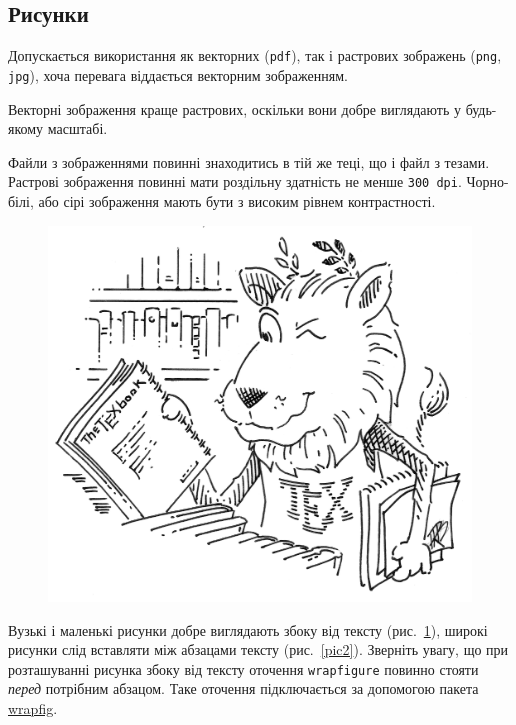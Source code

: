 \documentclass[]{iptconf}
\begin{document}





\subsection{Рисунки}





Допускається використання як векторних (\texttt{pdf}), так і растрових зображень (\texttt{png}, \texttt{jpg}), хоча перевага віддається векторним зображенням.

Векторні зображення краще растрових, оскільки вони добре виглядають у будь-якому масштабі.
\begin{tcolorbox}[breakable,enhanced,arc=0mm,colback=gray!5,colframe=red!80!black,leftrule=2mm]
	Файли з зображеннями повинні знаходитись в тій же теці, що і файл з тезами.
	Растрові зображення повинні мати роздільну здат\-ність не менше \texttt{300 dpi}. Чорно-білі, або сірі зображення мають бути з високим рівнем контрастності.
\end{tcolorbox}

\begin{figure}\centering
	\includegraphics[width=0.35\columnwidth]{image}
	\label{pic1}
\end{figure}
Вузькі і маленькі рисунки добре виглядають збоку від тексту (рис.~\ref{pic1}), широкі рисунки слід вставляти між абзацами тексту  (рис.~\ref{pic2}).
Зверніть увагу, що при розташуванні рисунка збоку від тексту оточення \texttt{wrapfigure} повинно стояти \emph{перед} потрібним абзацом. Таке оточення підключається за допомогою пакета \href{http://www.ctan.org/pkg/wrapfig}{wrapfig}.
\end{document}
